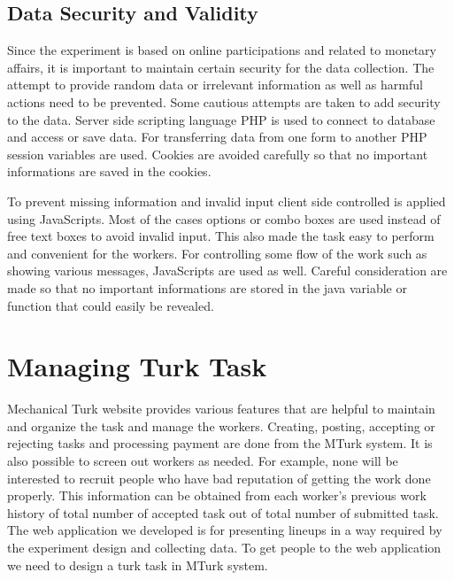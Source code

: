 \documentclass[11pt]{article}
\begin{document}


\subsection{Data Security and Validity} 

Since the experiment is based on online participations and related to monetary affairs, it is important to maintain certain security for the data collection. The attempt to provide random data or irrelevant information as well as harmful actions need to be prevented.  Some cautious attempts are taken to add security to the data. Server side scripting language PHP is used to connect to database and access or save data. For transferring data from one form to another PHP session variables are used. Cookies are avoided carefully so that no important informations are saved in the cookies. 

To prevent missing information and invalid input client side controlled is applied using JavaScripts. Most of the cases options or combo boxes are used instead of free text boxes to avoid invalid input. This also made the task easy to perform and convenient for the workers. For controlling some flow of the work such as showing various messages, JavaScripts are used as well. Careful consideration are made so that no important informations are stored in the java variable or function that could easily be revealed.


\section{Managing Turk Task}\label{sec:turk_task} \cite{turk} Mechanical Turk website provides various features that are helpful to maintain and organize the task and manage the workers. Creating, posting, accepting or rejecting tasks and processing payment are done from the MTurk system. It is also possible to screen out workers as needed. For example, none will be interested to recruit people who have bad reputation of getting the work done properly. This information can be obtained from each worker's previous work history of total number of accepted task out of total number of submitted task. The web application we developed is for presenting lineups in a way required by the experiment design and collecting data. To get people to the web application we need to design a turk task in MTurk system.
\end{document}
